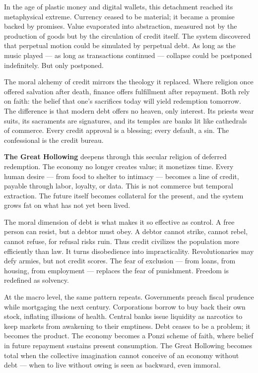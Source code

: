 \documentclass[11pt,twoside]{book}
\begin{document}
In the age of plastic money and digital wallets, this detachment reached its metaphysical extreme.  
Currency ceased to be material; it became a promise backed by promises.  
Value evaporated into abstraction, measured not by the production of goods but by the circulation of credit itself.  
The system discovered that perpetual motion could be simulated by perpetual debt.  
As long as the music played --- as long as transactions continued --- collapse could be postponed indefinitely.  
But only postponed.

The moral alchemy of credit mirrors the theology it replaced.  
Where religion once offered salvation after death, finance offers fulfillment after repayment.  
Both rely on faith: the belief that one’s sacrifices today will yield redemption tomorrow.  
The difference is that modern debt offers no heaven, only interest.  
Its priests wear suits, its sacraments are signatures, and its temples are banks lit like cathedrals of commerce.  
Every credit approval is a blessing; every default, a sin.  
The confessional is the credit bureau.

\textbf{The Great Hollowing} deepens through this secular religion of deferred redemption.  
The economy no longer creates value; it monetizes time.  
Every human desire --- from food to shelter to intimacy --- becomes a line of credit, payable through labor, loyalty, or data.  
This is not commerce but temporal extraction.  
The future itself becomes collateral for the present, and the system grows fat on what has not yet been lived.

The moral dimension of debt is what makes it so effective as control.  
A free person can resist, but a debtor must obey.  
A debtor cannot strike, cannot rebel, cannot refuse, for refusal risks ruin.  
Thus credit civilizes the population more efficiently than law.  
It turns disobedience into impracticality.  
Revolutionaries may defy armies, but not credit scores.  
The fear of exclusion --- from loans, from housing, from employment --- replaces the fear of punishment.  
Freedom is redefined as solvency.

At the macro level, the same pattern repeats.  
Governments preach fiscal prudence while mortgaging the next century.  
Corporations borrow to buy back their own stock, inflating illusions of health.  
Central banks issue liquidity as narcotics to keep markets from awakening to their emptiness.  
Debt ceases to be a problem; it becomes the product.  
The economy becomes a Ponzi scheme of faith, where belief in future repayment sustains present consumption.  
The Great Hollowing becomes total when the collective imagination cannot conceive of an economy without debt --- when to live without owing is seen as backward, even immoral.
\end{document}
